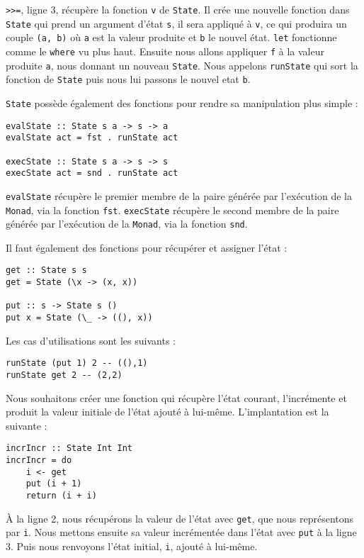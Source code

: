 \documentclass{llncs}
\begin{document}
\lstinline{>>=}, ligne 3, récupère la fonction \lstinline{v} de \lstinline{State}.
Il crée une nouvelle fonction dans \lstinline{State} qui prend
un argument d'état \lstinline{s}, il sera appliqué à \lstinline{v}, ce qui
produira un couple \lstinline{(a, b)} où \lstinline{a} est la valeur produite
et  \lstinline{b} le nouvel état.
\lstinline{let} fonctionne comme le \lstinline{where} vu plus haut.
Ensuite nous allons appliquer \lstinline{f} à la valeur produite \lstinline{a},
nous donnant un nouveau \lstinline{State}.
Nous appelons \lstinline{runState} qui sort la fonction de \lstinline{State}
puis nous lui passons le nouvel etat \lstinline{b}.

\lstinline{State} possède également des fonctions pour rendre sa manipulation
plus simple :
\begin{lstlisting}
evalState :: State s a -> s -> a
evalState act = fst . runState act

execState :: State s a -> s -> s
execState act = snd . runState act
\end{lstlisting}
\lstinline{evalState} récupère le premier membre de la paire générée par l'exécution
de la \lstinline{Monad}, via la fonction \lstinline{fst}.
\lstinline{execState} récupère le second membre de la paire générée par l'exécution
de la \lstinline{Monad}, via la fonction \lstinline{snd}.

Il faut également des fonctions pour récupérer et assigner l'état :
\begin{lstlisting}
get :: State s s
get = State (\x -> (x, x))

put :: s -> State s ()
put x = State (\_ -> ((), x))
\end{lstlisting}

Les cas d'utilisations sont les suivants :
\begin{lstlisting}
runState (put 1) 2 -- ((),1)
runState get 2 -- (2,2)
\end{lstlisting}

Nous souhaitons créer une fonction qui récupère l'état courant,
l'incrémente et produit la valeur initiale de l'état ajouté à lui-même.
L'implantation est la suivante :
\begin{lstlisting}
incrIncr :: State Int Int
incrIncr = do
    i <- get
    put (i + 1)
    return (i + i)
\end{lstlisting}
À la ligne 2, nous récupérons la valeur de l'état avec \lstinline{get}, que nous
représentons par \lstinline{i}.
Nous mettons ensuite sa valeur incrémentée dans l'état avec \lstinline{put} à la
ligne 3.
Puis nous renvoyons l'état initial, \lstinline{i}, ajouté à lui-même.
\end{document}
